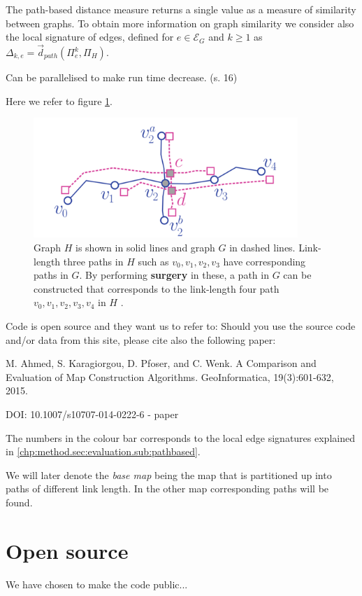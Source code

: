 The path-based distance measure returns a single value as a measure of similarity between graphs. To obtain more information on graph similarity we consider also the local signature of edges, defined for $e\in \mathcal{E}_G$ and $k \geq 1$ as $\Delta_{k,e} = \overrightarrow{d}_{path} (\Pi_e^k, \Pi_H)$. 

Can be parallelised to make run time decrease. (s. 16)

Here we refer to figure \ref{fig:theory/path}.

\begin{figure}[H]
    \centering
    \includegraphics[width=10cm]{Figures/Method/path.png}
    \caption{Graph $H$ is shown in solid lines and graph $G$ in dashed lines. Link-length three paths in $H$ such as $v_0, v_1, v_2, v_3$ have corresponding paths in $G$. By performing \textbf{surgery} in these, a path in $G$ can be constructed that corresponds to the link-length four path $v_0, v_1, v_2, v_3, v_4$ in $H$ \citep{pathbased}.}
    \label{fig:theory/path}
\end{figure}


Code is open source and they want us to refer to:
Should you use the source code and/or data from this site, please cite also the following paper:

M. Ahmed, S. Karagiorgou, D. Pfoser, and C. Wenk. A Comparison and Evaluation of Map Construction Algorithms. GeoInformatica, 19(3):601-632, 2015.

DOI: 10.1007/s10707-014-0222-6 - paper


The numbers in the colour bar corresponds to the local edge signatures explained in \ref{chp:method.sec:evaluation.sub:pathbased}.

We will later denote the \textit{base map} being the map that is partitioned up into paths of different link length. In the other map corresponding paths will be found.

\section{Open source}
\label{chp:method.sec:opensource}

We have chosen to make the code public...





